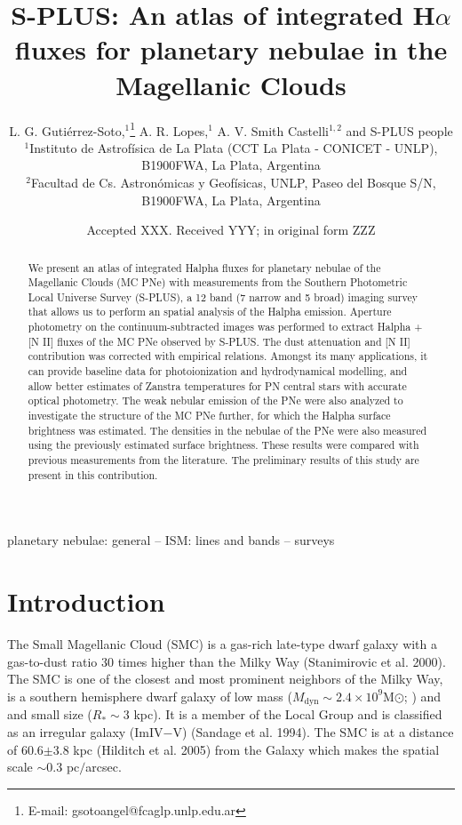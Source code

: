 \documentclass[fleqn,usenatbib]{mnras}
\title[S-PLUS: H$\alpha$ fluxes for planetary nebulae]{S-PLUS: An atlas of integrated H$\alpha$ fluxes for planetary nebulae in the Magellanic Clouds}
\author[L. G. Gutiérrez-Soto et al.]{
L. G. Gutiérrez-Soto,$^{1}$\thanks{E-mail: gsotoangel@fcaglp.unlp.edu.ar}
A. R. Lopes,$^{1}$
A. V. Smith Castelli$^{1,2}$
and S-PLUS people
\\
$^{1}$Instituto de Astrof\'{i}sica de La Plata (CCT La Plata - CONICET - UNLP), B1900FWA, La Plata, Argentina\\
$^{2}$Facultad de Cs. Astronómicas y Geofísicas, UNLP, Paseo del Bosque S/N, B1900FWA, La Plata, Argentina
}
\date{Accepted XXX. Received YYY; in original form ZZZ}
\begin{document}
\label{firstpage}
\pagerange{\pageref{firstpage}--\pageref{lastpage}}
\maketitle

\begin{abstract}
We present an atlas of integrated Halpha fluxes for planetary nebulae of the Magellanic Clouds (MC PNe) with measurements from the Southern Photometric Local Universe Survey (S-PLUS), a 12 band (7 narrow and 5 broad) imaging survey that allows us to perform an spatial analysis of the Halpha emission. Aperture photometry on the continuum-subtracted images was performed to extract Halpha + [N II] fluxes of the MC PNe observed by S-PLUS. The dust attenuation and [N II] contribution was corrected with empirical relations. Amongst its many applications, it can provide baseline data for photoionization and hydrodynamical modelling, and allow better estimates of Zanstra temperatures for PN central stars with accurate optical photometry. The weak nebular emission of the PNe were also analyzed to investigate the structure of the MC PNe further, for which the Halpha surface brightness was estimated. The densities in the nebulae of the PNe were also measured using the previously estimated surface brightness. These results were compared with previous measurements from the literature. The preliminary results of this study are present in this contribution.
\end{abstract}

\begin{keywords}
planetary nebulae: general -- ISM: lines and bands -- surveys
\end{keywords}



\section{Introduction}

The Small Magellanic Cloud (SMC) is a gas-rich late-type dwarf galaxy \citep{Bolatto:2007}
with a gas-to-dust ratio 30 times higher than the Milky Way (Stanimirovic et al. 2000).
The SMC is one of the closest and most prominent neighbors of the Milky Way, is a southern hemisphere dwarf galaxy of low mass ($M_\text{dyn} \sim 2.4\times 10^{9}$M$\odot$; \citealp{Stanimirovi:2004}) and and small size ($R_{*} \sim 3$ kpc).
It is a member of the Local Group and is classified as an irregular galaxy (ImIV$-$V)
(Sandage et al. 1994). The SMC is at a distance of 60.6$\pm$3.8 kpc (Hilditch et al. 2005)
from the Galaxy which makes the spatial scale $\sim$0.3 pc$/$arcsec.
\end{document}
